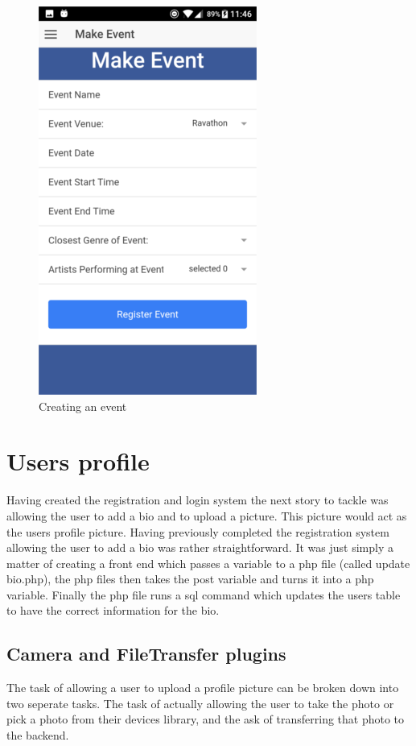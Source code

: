 \begin{figure}[H]
\includegraphics[scale=0.5]{images/sc18}
\caption{Creating an event}
\end{figure}

\section{Users profile}
Having created the registration and login system the next story to tackle was allowing the user to add a bio and to upload a picture. This picture would act as the users profile picture. Having previously completed the registration system allowing the user to add a bio was rather straightforward. It was just simply a matter of creating a front end which passes a variable to a php file (called update bio.php), the php files then takes the post variable and turns it into a php variable. Finally the php file runs a sql command which updates the users table to have the correct information for the bio.

\subsection{Camera and FileTransfer plugins}
The task of allowing a user to upload a profile picture can be broken down into two seperate tasks. The task of actually allowing the user to take the photo or pick a photo from their devices library, and the ask of transferring that photo to the backend. 

